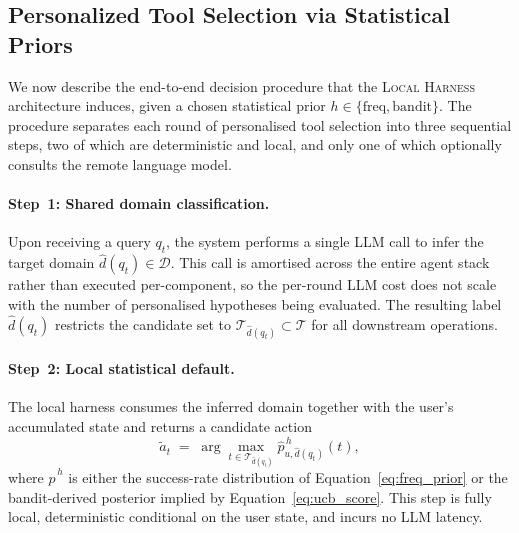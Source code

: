 
\subsection{Personalized Tool Selection via Statistical Priors}
\label{sec:method:overall}

We now describe the end-to-end decision procedure that the
\textsc{Local Harness} architecture induces, given a chosen statistical
prior $h\in\{\mathrm{freq},\mathrm{bandit}\}$. The procedure separates
each round of personalised tool selection into three sequential steps,
two of which are deterministic and local, and only one of which
optionally consults the remote language model.

\paragraph{Step~1: Shared domain classification.}
Upon receiving a query $q_t$, the system performs a single LLM call to
infer the target domain $\hat d(q_t)\in\mathcal{D}$. This call is
amortised across the entire agent stack rather than executed
per-component, so the per-round LLM cost does not scale with the
number of personalised hypotheses being evaluated. The resulting label
$\hat d(q_t)$ restricts the candidate set to
$\mathcal{T}_{\hat d(q_t)}\subset\mathcal{T}$ for all downstream
operations.

\paragraph{Step~2: Local statistical default.}
The local harness consumes the inferred domain together with the
user's accumulated state and returns a candidate action
\begin{equation}
\tilde a_t \;=\; \arg\max_{t\in\mathcal{T}_{\hat d(q_t)}}
\hat p^{\,h}_{u,\hat d(q_t)}(t),
\label{eq:harness_default}
\end{equation}
where $\hat p^{\,h}$ is either the success-rate distribution of
Equation~\eqref{eq:freq_prior} or the bandit-derived posterior implied
by Equation~\eqref{eq:ucb_score}. This step is fully local, deterministic
conditional on the user state, and incurs no LLM latency.

